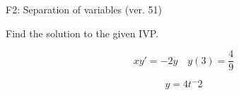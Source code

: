 \begin{exercise}
  \begin{exerciseTitle}F2: Separation of variables (ver. 51)\end{exerciseTitle}
  \begin{exerciseStatement}
    
Find the solution to the given IVP.

    
\[xy'= -2 y \hspace{1em} y( 3 ) = \frac{4}{9}\]

  \end{exerciseStatement}
  \begin{exerciseAnswer}
    
\[y= 4 t^ -2\]

  \end{exerciseAnswer}
\end{exercise}